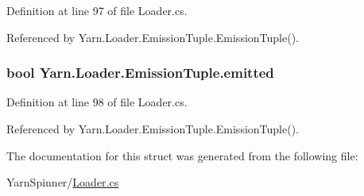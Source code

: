 Definition at line 97 of file Loader.\-cs.



Referenced by Yarn.\-Loader.\-Emission\-Tuple.\-Emission\-Tuple().

\hypertarget{a00087_a5916dbbd4d2e24ddfd02b0afdea290bf}{
\subsubsection[{emitted}]{\setlength{\rightskip}{0pt plus 5cm}bool Yarn.\-Loader.\-Emission\-Tuple.\-emitted}}\label{a00087_a5916dbbd4d2e24ddfd02b0afdea290bf}


Definition at line 98 of file Loader.\-cs.



Referenced by Yarn.\-Loader.\-Emission\-Tuple.\-Emission\-Tuple().



The documentation for this struct was generated from the following file\-:\begin{DoxyCompactItemize}
\item 
Yarn\-Spinner/\hyperlink{a00294}{Loader.\-cs}\end{DoxyCompactItemize}
